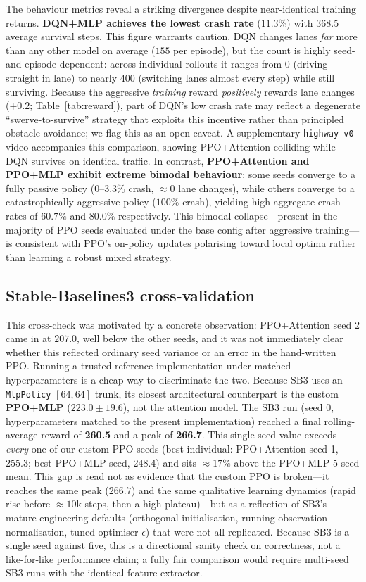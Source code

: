 \documentclass[conference]{IEEEtran}
\newcommand{\code}[1]{\texttt{#1}}
\begin{document}
The behaviour metrics reveal a striking divergence despite near-identical training
returns. \textbf{DQN+MLP achieves the lowest crash rate} ($11.3\%$) with
$368.5$ average survival steps. This figure warrants caution. DQN changes lanes
\emph{far} more than any other model on average ($155$ per episode), but the
count is highly seed- and episode-dependent: across individual rollouts it ranges
from $0$ (driving straight in lane) to nearly $400$ (switching lanes almost every
step) while still surviving. Because the aggressive \emph{training} reward
\emph{positively} rewards lane changes ($+0.2$; Table~\ref{tab:reward}), part of
DQN's low crash rate may reflect a degenerate ``swerve-to-survive'' strategy that
exploits this incentive rather than principled obstacle avoidance; we flag this
as an open caveat. A supplementary \code{highway-v0} video accompanies this
comparison, showing PPO+Attention colliding while DQN survives on identical
traffic. In contrast, \textbf{PPO+Attention and PPO+MLP exhibit
extreme bimodal behaviour}: some seeds converge to a fully passive policy
($0$--$3.3\%$ crash, $\approx 0$ lane changes), while others converge to a
catastrophically aggressive policy ($100\%$ crash), yielding high aggregate
crash rates of $60.7\%$ and $80.0\%$ respectively. This bimodal collapse---present
in the majority of PPO seeds evaluated under the base config after aggressive
training---is consistent with PPO's on-policy updates polarising toward local
optima rather than learning a robust mixed strategy.

\subsection{Stable-Baselines3 cross-validation}
This cross-check was motivated by a concrete observation: PPO+Attention seed 2
came in at $207.0$, well below the other seeds, and it was not immediately clear
whether this reflected ordinary seed variance or an error in the hand-written
PPO. Running a trusted reference implementation under matched hyperparameters is
a cheap way to discriminate the two. Because SB3 uses an \code{MlpPolicy}
$[64,64]$ trunk, its closest architectural counterpart is the custom
\textbf{PPO+MLP} ($223.0 \pm 19.6$), not the attention model. The SB3 run
(seed 0, hyperparameters matched to the present implementation) reached a final
rolling-average reward of \textbf{260.5} and a peak of \textbf{266.7}. This
single-seed value exceeds \emph{every} one of our custom PPO seeds (best
individual: PPO+Attention seed 1, $255.3$; best PPO+MLP seed, $248.4$) and sits
${\approx}17\%$ above the PPO+MLP 5-seed mean. This gap is read not as evidence
that the custom PPO is broken---it reaches the same peak ($266.7$) and the same
qualitative learning dynamics (rapid rise before ${\approx}10$k steps, then a
high plateau)---but as a reflection of SB3's mature engineering defaults
(orthogonal initialisation, running observation normalisation, tuned optimiser
$\epsilon$) that were not all replicated. Because SB3 is a single seed against
five, this is a directional sanity check on correctness, not a like-for-like
performance claim; a fully fair comparison would require multi-seed SB3 runs
with the identical feature extractor.
\end{document}
